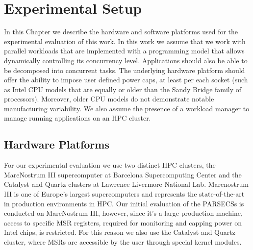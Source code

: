 
\chapter{Experimental Setup}
\label{chap:methodology}

In this Chapter we describe the hardware and software platforms used for the experimental
evaluation of this work.  In this work we assume that we work with parallel workloads that
are implemented with a programming model that allows dynamically controlling its
concurrency level.  Applications should also be able to be decomposed into concurrent
tasks.  The underlying hardware platform should offer the ability to impose user defined
power caps, at least per each socket (such as Intel CPU models that are equally or older
than the Sandy Bridge family of processors).  Moreover, older CPU models do not
demonstrate notable manufacturing variability.
We also assume the presence of a workload manager to manage running applications on an 
HPC cluster.   

\section{Hardware Platforms} 
\label{sec:platforms}
For our experimental evaluation we use two distinct HPC
clusters, the MareNostrum III supercomputer at Barcelona Supercomputing Center and the
Catalyst and Quartz clusters at Lawrence Livermore National Lab.  Marenostrum III is one
of Europe's largest supercomputers and represents the state-of-the-art in production
environments in HPC.  Our initial evaluation of the PARSECSs is conducted on MareNostrum
III, however, since it's a large production machine, access to specific MSR registers,
required for monitoring and capping power on Intel chips, is restricted.  For this reason
we also use the Catalyst and Quartz cluster, where MSRs are accessible by the user through
special kernel modules. 

